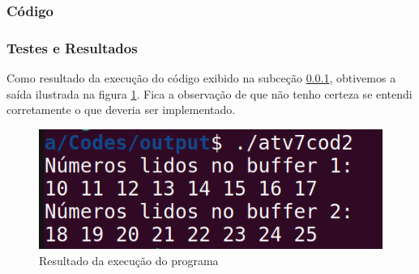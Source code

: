 \documentclass{article}
\begin{document}
\subsubsection{Código}
\label{sub-sec-cod}




\subsubsection{Testes e Resultados}
Como resultado da execução do código exibido na subceção \ref{sub-sec-cod}, obtivemos a saída ilustrada na figura \ref{fig:exec}. Fica a observação de que não tenho certeza se entendi corretamente o que deveria ser implementado.

\begin{figure}[ht]
    \centering
    \includegraphics[width=1\textwidth]{./Images/res7.png}
    \caption{Resultado da execução do programa}
    \label{fig:exec}
\end{figure}

\printbibliography %
\end{document}
